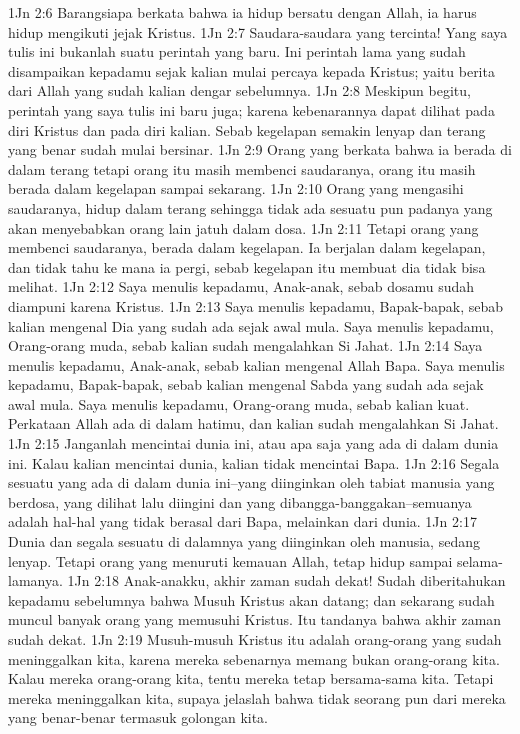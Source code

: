 1Jn 2:6  Barangsiapa berkata bahwa ia hidup bersatu dengan Allah, ia harus hidup mengikuti jejak Kristus.
1Jn 2:7  Saudara-saudara yang tercinta! Yang saya tulis ini bukanlah suatu perintah yang baru. Ini perintah lama yang sudah disampaikan kepadamu sejak kalian mulai percaya kepada Kristus; yaitu berita dari Allah yang sudah kalian dengar sebelumnya.
1Jn 2:8  Meskipun begitu, perintah yang saya tulis ini baru juga; karena kebenarannya dapat dilihat pada diri Kristus dan pada diri kalian. Sebab kegelapan semakin lenyap dan terang yang benar sudah mulai bersinar.
1Jn 2:9  Orang yang berkata bahwa ia berada di dalam terang tetapi orang itu masih membenci saudaranya, orang itu masih berada dalam kegelapan sampai sekarang.
1Jn 2:10  Orang yang mengasihi saudaranya, hidup dalam terang sehingga tidak ada sesuatu pun padanya yang akan menyebabkan orang lain jatuh dalam dosa.
1Jn 2:11  Tetapi orang yang membenci saudaranya, berada dalam kegelapan. Ia berjalan dalam kegelapan, dan tidak tahu ke mana ia pergi, sebab kegelapan itu membuat dia tidak bisa melihat.
1Jn 2:12  Saya menulis kepadamu, Anak-anak, sebab dosamu sudah diampuni karena Kristus.
1Jn 2:13  Saya menulis kepadamu, Bapak-bapak, sebab kalian mengenal Dia yang sudah ada sejak awal mula. Saya menulis kepadamu, Orang-orang muda, sebab kalian sudah mengalahkan Si Jahat.
1Jn 2:14  Saya menulis kepadamu, Anak-anak, sebab kalian mengenal Allah Bapa. Saya menulis kepadamu, Bapak-bapak, sebab kalian mengenal Sabda yang sudah ada sejak awal mula. Saya menulis kepadamu, Orang-orang muda, sebab kalian kuat. Perkataan Allah ada di dalam hatimu, dan kalian sudah mengalahkan Si Jahat.
1Jn 2:15  Janganlah mencintai dunia ini, atau apa saja yang ada di dalam dunia ini. Kalau kalian mencintai dunia, kalian tidak mencintai Bapa.
1Jn 2:16  Segala sesuatu yang ada di dalam dunia ini--yang diinginkan oleh tabiat manusia yang berdosa, yang dilihat lalu diingini dan yang dibangga-banggakan--semuanya adalah hal-hal yang tidak berasal dari Bapa, melainkan dari dunia.
1Jn 2:17  Dunia dan segala sesuatu di dalamnya yang diinginkan oleh manusia, sedang lenyap. Tetapi orang yang menuruti kemauan Allah, tetap hidup sampai selama-lamanya.
1Jn 2:18  Anak-anakku, akhir zaman sudah dekat! Sudah diberitahukan kepadamu sebelumnya bahwa Musuh Kristus akan datang; dan sekarang sudah muncul banyak orang yang memusuhi Kristus. Itu tandanya bahwa akhir zaman sudah dekat.
1Jn 2:19  Musuh-musuh Kristus itu adalah orang-orang yang sudah meninggalkan kita, karena mereka sebenarnya memang bukan orang-orang kita. Kalau mereka orang-orang kita, tentu mereka tetap bersama-sama kita. Tetapi mereka meninggalkan kita, supaya jelaslah bahwa tidak seorang pun dari mereka yang benar-benar termasuk golongan kita.
